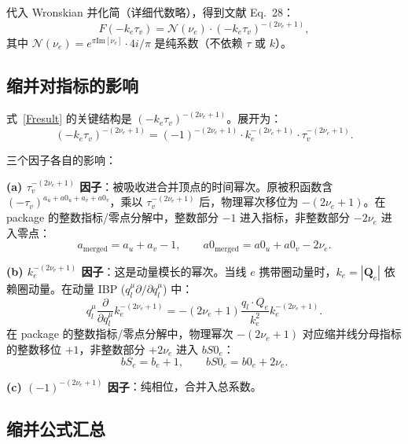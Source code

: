 ﻿\documentclass[a4paper,11pt]{article}
\begin{document}
代入 Wronskian 并化简（详细代数略），得到文献 Eq.~28：
\begin{equation}
  \boxed{F(-k_e\tau_v) = \mathcal{N}(\nu_e) \cdot (-k_e\tau_v)^{-(2\nu_e + 1)},}
  \label{Fresult}
\end{equation}
其中 $\mathcal{N}(\nu_e) = e^{\pi \text{Im}[\nu_e]} \cdot 4i/\pi$ 是纯系数（不依赖 $\tau$ 或 $k$）。

\subsection{缩并对指标的影响}

式~\eqref{Fresult} 的关键结构是 $(-k_e\tau_v)^{-(2\nu_e+1)}$。展开为：
\begin{equation}
  (-k_e\tau_v)^{-(2\nu_e+1)} = (-1)^{-(2\nu_e+1)} \cdot k_e^{-(2\nu_e+1)} \cdot \tau_v^{-(2\nu_e+1)}.
  \label{Fexpand}
\end{equation}

三个因子各自的影响：

\textbf{(a) $\tau_v^{-(2\nu_e+1)}$ 因子}：被吸收进合并顶点的时间幂次。原被积函数含 $(-\tau_v)^{a_u+a0_u+a_v+a0_v}$，乘以 $\tau_v^{-(2\nu_e+1)}$ 后，物理幂次移位为 $-(2\nu_e+1)$。在 package 的整数指标/零点分解中，整数部分 $-1$ 进入指标，非整数部分 $-2\nu_e$ 进入零点：
\begin{equation}
  \boxed{a_{\text{merged}} = a_u + a_v - 1,\qquad a0_{\text{merged}} = a0_u + a0_v - 2\nu_e.}
  \label{ashift}
\end{equation}

\textbf{(b) $k_e^{-(2\nu_e+1)}$ 因子}：这是动量模长的幂次。当线 $e$ 携带圈动量时，$k_e = |\boldsymbol{Q}_e|$ 依赖圈动量。在动量 IBP ($q_l^\mu \partial/\partial q_l^\mu$) 中：
\begin{equation}
  q_l^\mu \frac{\partial}{\partial q_l^\mu} k_e^{-(2\nu_e+1)} = -(2\nu_e+1) \frac{q_l \cdot Q_e}{k_e^2} k_e^{-(2\nu_e+1)}.
  \label{kshift}
\end{equation}
在 package 的整数指标/零点分解中，物理幂次 $-(2\nu_e+1)$ 对应缩并线分母指标的整数移位 $+1$，非整数部分 $+2\nu_e$ 进入 $bS0_e$：
\begin{equation}
  \boxed{bS_e = b_e + 1,\qquad bS0_e = b0_e + 2\nu_e.}
  \label{bSdef}
\end{equation}

\textbf{(c) $(-1)^{-(2\nu_e+1)}$ 因子}：纯相位，合并入总系数。

\subsection{缩并公式汇总}
\end{document}
